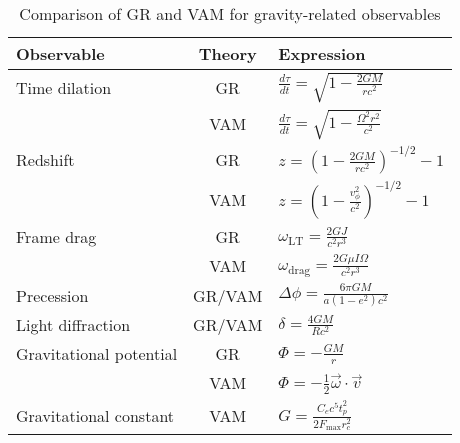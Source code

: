 \begin{table}[ht]
    \centering
    \caption{Comparison of GR and VAM for gravity-related observables}
    \label{tab:VAM-GR}
    \begin{tabular}{|l|c|l|}
        \hline
        \textbf{Observable} & \textbf{Theory} & \textbf{Expression} \\
        \hline
        Time dilation & GR & $ \frac{d\tau}{dt} = \sqrt{1 - \frac{2GM}{rc^2}} $ \\
        & VAM & $ \frac{d\tau}{dt} = \sqrt{1 - \frac{\Omega^2 r^2}{c^2}} $ \\
        \hline
        Redshift & GR & $ z = \left(1 - \frac{2GM}{rc^2} \right)^{-1/2} - 1 $ \\
        & VAM & $ z = \left(1 - \frac{v_\phi^2}{c^2} \right)^{-1/2} - 1 $ \\
        \hline
        Frame drag & GR & $ \omega_\text{LT} = \frac{2GJ}{c^2 r^3} $ \\
        & VAM & $ \omega_\text{drag} = \frac{2G \mu I \Omega}{c^2 r^3} $ \\
        \hline
        Precession & GR/VAM & $ \Delta\phi = \frac{6\pi GM}{a(1 - e^2)c^2} $ \\
        \hline
        Light diffraction & GR/VAM & $ \delta = \frac{4GM}{Rc^2} $ \\
        \hline
        Gravitational potential & GR & $ \Phi = -\frac{GM}{r} $ \\
        & VAM & $ \Phi = -\frac{1}{2} \vec{\omega} \cdot \vec{v} $ \\
        \hline
        Gravitational constant & VAM & $ G = \frac{C_e c^5 t_p^2}{2 F_{\max} r_c^2} $ \\
        \hline
    \end{tabular}
\end{table}

